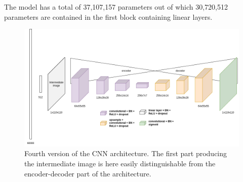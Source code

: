 The model has a total of 37,107,157 parameters out of which 30,720,512 parameters are contained in the first block containing linear layers.

\begin{figure}[H]\centering
\includegraphics[width=140mm]{img/cnnv4.drawio.png}
\caption{Fourth version of the CNN architecture. The first part producing the intermediate image is here easily distinguishable from the encoder-decoder part of the architecture.}
\label{img:methods:models:CNNv4}
\end{figure}


